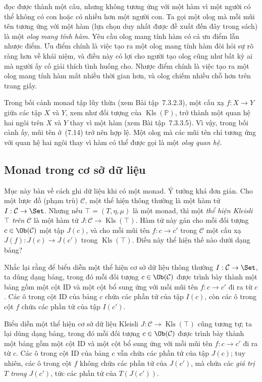đọc được thành một câu, nhưng không tương ứng với một hàm vì một người có thể không có con hoặc có nhiều hơn một người con. Ta gọi một olog mà mỗi mũi tên tương ứng với một hàm (lựa chọn duy nhất được đề xuất đến đây trong sách) là một \emph{olog mang tính hàm}. Yêu cầu olog mang tính hàm có cả ưu điểm lẫn nhược điểm. Ưu điểm chính là việc tạo ra một olog mang tính hàm đòi hỏi sự rõ ràng hơn về khái niệm, và điều này có lợi cho người tạo olog cũng như bất kỳ ai mà người ấy cố giải thích tình huống cho. Nhược điểm chính là việc tạo ra một olog mang tính hàm mất nhiều thời gian hơn, và olog chiếm nhiều chỗ hơn trên trang giấy.

Trong bối cảnh monad tập lũy thừa (xem Bài tập~7.3.2.3), một cấu xạ $f:X\to Y$ giữa các tập $X$ và $Y$, xem như đối tượng của $\operatorname{Kls}(\mathbb P)$, trở thành một quan hệ hai ngôi trên $X$ và $Y$ thay vì một hàm (xem Bài tập~7.3.3.5). Vì vậy, trong bối cảnh ấy, mũi tên ở~(7.14) trở nên hợp lệ. Một olog mà các mũi tên chỉ tương ứng với quan hệ hai ngôi thay vì hàm có thể được gọi là một \emph{olog quan hệ}.

\subsection{Monad trong cơ sở dữ liệu}
Mục này bàn về cách ghi dữ liệu khi có một monad. Ý tưởng khá đơn giản. Cho một lược đồ (phạm trù) $\mathcal C$, một thể hiện thông thường là một hàm tử $I:\mathcal C\to\Set$. Nhưng nếu $\top=(T,\eta,\mu)$ là một monad, thì một \emph{thể hiện Kleisli $\top$ trên $\mathcal C$} là một hàm tử $J:\mathcal C\to\operatorname{Kls}(\top)$. Hàm tử này gán cho mỗi đối tượng $c\in\Ob(\mathcal C)$ một tập $J(c)$, và cho mỗi mũi tên $f:c\to c'$ trong $\mathcal C$ một cấu xạ $J(f):J(c)\to J(c')$ trong $\operatorname{Kls}(\top)$. Điều này thể hiện thế nào dưới dạng bảng?

Nhắc lại rằng để biểu diễn một thể hiện cơ sở dữ liệu thông thường $I:\mathcal C\to\Set$, ta dùng dạng bảng, trong đó mỗi đối tượng $c\in\Ob(\mathcal C)$ được trình bày thành một bảng gồm một cột ID và một cột bổ sung ứng với mỗi mũi tên $f:c\to c'$ đi ra từ $c$. Các ô trong cột ID của bảng $c$ chứa các phần tử của tập $I(c)$, còn các ô trong cột $f$ chứa các phần tử của tập $I(c')$.

Biểu diễn một thể hiện cơ sở dữ liệu Kleisli $J:\mathcal C\to\operatorname{Kls}(\top)$ cũng tương tự; ta lại dùng dạng bảng, trong đó mỗi đối tượng $c\in\Ob(\mathcal C)$ được trình bày thành một bảng gồm một cột ID và một cột bổ sung ứng với mỗi mũi tên $f:c\to c'$ đi ra từ $c$. Các ô trong cột ID của bảng $c$ vẫn chứa các phần tử của tập $J(c)$; tuy nhiên, các ô trong cột $f$ không chứa các phần tử của $J(c')$, mà chứa các \emph{giá trị $T$ trong $J(c')$}, tức các phần tử của $T(J(c'))$.

